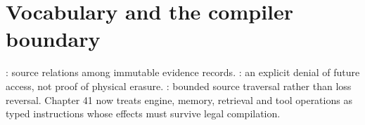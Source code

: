 \section{Vocabulary and the compiler boundary}
: source relations among immutable evidence records.
: an explicit denial of future access, not proof of physical
erasure. : bounded source traversal rather than loss reversal.
Chapter 41 now treats engine, memory, retrieval and tool operations as typed
instructions whose effects must survive legal compilation.
